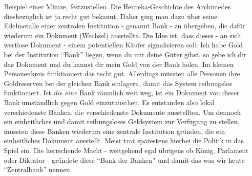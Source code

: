 Beispiel einer Münze, festzustellen. Die Heureka-Geschichte des Archimedes diesbezüglich ist ja recht gut bekannt. Daher ging man dazu über seine Edelmetalle einer zentralen Institution - genannt Bank - zu übergeben, die dafür wiederum ein Dokument (Wechsel) ausstellte. Die Idee ist, dass dieses - an sich wertlose Dokument - einem potentiellen Käufer signalisieren soll: Ich habe Gold bei der Institution "`Bank"' liegen, wenn du mir deine Güter gibst, so gebe ich dir das Dokument und du kannst dir mein Gold von der Bank holen. Im kleinen Personenkreis funktioniert das recht gut. Allerdings müssten alle Personen ihre Goldreserven bei der gleichen Bank einlagern, damit das System reibungslos funktioniert. Ist \textit{die eine} Bank räumlich weit weg, ist ein Dokument von dieser Bank umständlich gegen Gold einzutauschen. Es entstanden also lokal verschiedenste Banken, die verschiedenste Dokumente ausstellten. Um dennoch ein einheitliches und damit reibungsloses Geldsystem zur Verfügung zu stellen, mussten diese Banken wiederum eine zentrale Institution gründen, die ein einheitliches Dokument ausstellt. Meist trat spätestens hierbei die Politik in das Spiel ein. Die herrschende Macht - weitgehend egal übrigens ob König, Parlament oder Diktator - gründete diese "`Bank der Banken"' und damit das was wir heute "`Zentralbank"' nennen.

